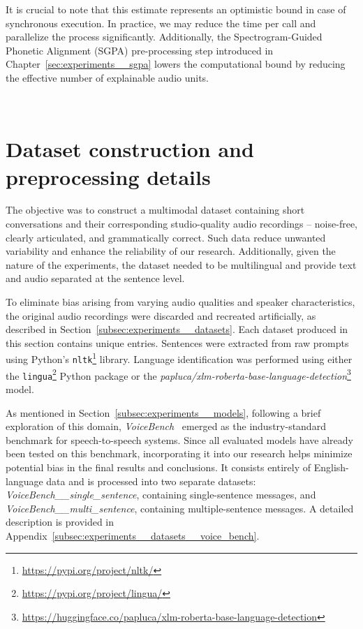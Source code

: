 \begin{appendices}
\begin{enumerate}[itemsep=4pt, topsep=4pt, left=10pt]
    \end{enumerate}

    It is crucial to note that this estimate represents an optimistic bound in case of synchronous execution. In practice, we may reduce the time per call and parallelize the process significantly. Additionally, the Spectrogram-Guided Phonetic Alignment (SGPA) pre-processing step introduced in Chapter~\ref{sec:experiments__sgpa} lowers the computational bound by reducing the effective number of explainable audio units.

    \newpage \ \null\thispagestyle{empty}\newpage
    \chapter{Dataset construction and preprocessing details}
    \label{app:datasets_construction}

    The objective was to construct a multimodal dataset containing short conversations and their corresponding studio-quality audio recordings -- noise-free, clearly articulated, and grammatically correct. Such data reduce unwanted variability and enhance the reliability of our research. Additionally, given the nature of the experiments, the dataset needed to be multilingual and provide text and audio separated at the sentence level.

    To eliminate bias arising from varying audio qualities and speaker characteristics, the original audio recordings were discarded and recreated artificially, as described in Section~\ref{subsec:experiments__datasets}. Each dataset produced in this section contains unique entries. Sentences were extracted from raw prompts using Python’s \texttt{nltk}\footnote{\url{https://pypi.org/project/nltk/}} library. Language identification was performed using either the \texttt{lingua}\footnote{\url{https://pypi.org/project/lingua/}} Python package or the \textit{papluca/xlm-roberta-base-language-detection}\footnote{\url{https://huggingface.co/papluca/xlm-roberta-base-language-detection}} model.

    As mentioned in Section~\ref{subsec:experiments__models}, following a brief exploration of this domain, \textit{VoiceBench}~\parencite{chen2024voicebench} emerged as the industry-standard benchmark for speech-to-speech systems. Since all evaluated models have already been tested on this benchmark, incorporating it into our research helps minimize potential bias in the final results and conclusions. It consists entirely of English-language data and is processed into two separate datasets: \textit{VoiceBench\_\_single\_sentence}, containing single-sentence messages, and \textit{VoiceBench\_\_multi\_sentence}, containing multiple-sentence messages. A detailed description is provided in Appendix~\ref{subsec:experiments__datasets__voice_bench}.


\end{appendices}
